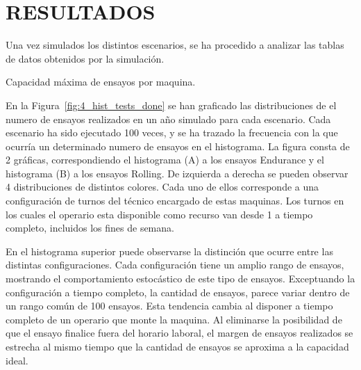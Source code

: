 
\section{RESULTADOS}

Una vez simulados los distintos escenarios,
se ha procedido a analizar las tablas de datos obtenidos por la simulación.

\begin{table}
	\centering
	\caption{Capacidad máxima de ensayos por maquina.}
	
	\label{tab:4_tbl_max_cap}
\end{table}

En la Figura~\ref{fig:4_hist_tests_done} se han graficado
las distribuciones de el numero de ensayos realizados en un año simulado
para cada escenario. Cada escenario ha sido ejecutado 100 veces,
y se ha trazado la frecuencia
con la que ocurría un determinado numero de ensayos en el histograma.
La figura consta de 2 gráficas,
correspondiendo el histograma (A) a los ensayos Endurance
y el histograma (B) a los ensayos Rolling.
De izquierda a derecha se pueden observar 4 distribuciones de distintos colores.
Cada uno de ellos corresponde a una configuración de turnos
del técnico encargado de estas maquinas.
Los turnos en los cuales el operario esta disponible como recurso
van desde 1 a tiempo completo, incluidos los fines de semana.

En el histograma superior puede observarse la distinción
que ocurre entre las distintas configuraciones.
Cada configuración tiene un amplio rango de ensayos,
mostrando el comportamiento estocástico de este tipo de ensayos.
Exceptuando la configuración a tiempo completo,
la cantidad de ensayos, parece variar dentro de un rango común de 100 ensayos.
Esta tendencia cambia al disponer a tiempo completo
de un operario que monte la maquina.
Al eliminarse la posibilidad
de que el ensayo finalice fuera del horario laboral,
el margen de ensayos realizados se estrecha al mismo tiempo
que la cantidad de ensayos se aproxima a la capacidad ideal.

